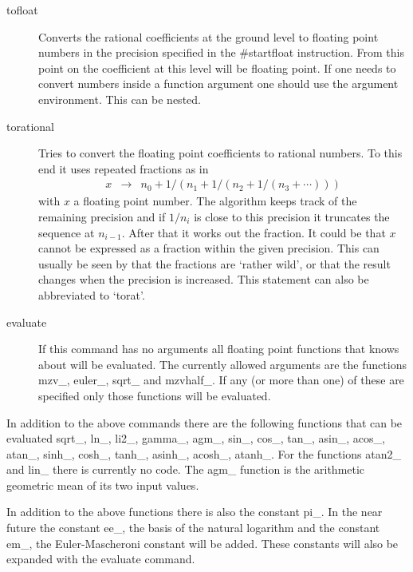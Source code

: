 \begin{description}
\item[tofloat] Converts the rational coefficients at the ground level to 
floating point numbers in the precision specified in the \#startfloat 
instruction. From this point on the coefficient at this level will be 
floating point. If one needs to convert numbers inside a function argument 
one should use the argument environment. This can be nested.
\item[torational] Tries to convert the floating point coefficients to 
rational numbers. To this end it uses repeated fractions as in
\begin{eqnarray}
	x & \rightarrow & n_0 + 1/(n_1+1/(n_2+1/(n_3+\cdots))) \nonumber
\end{eqnarray}
with $x$ a floating point number. The algorithm keeps track of the 
remaining precision and if $1/n_i$ is close to this precision it truncates 
the sequence at $n_{i-1}$. After that it works out the fraction. It could 
be that $x$ cannot be expressed as a fraction within the given precision. 
This can usually be seen by that the fractions are `rather wild', or that 
the result changes when the precision is increased. This statement can also 
be abbreviated to `torat'.
\item[evaluate] If this command has no arguments all floating point 
functions that \FORM knows about will be evaluated. The currently allowed 
arguments are the functions mzv\_, euler\_, sqrt\_ and mzvhalf\_. If any 
(or more than one) of these are specified only those functions will be 
evaluated.
\end{description}
In addition to the above commands there are the following functions that 
can be evaluated sqrt\_, ln\_, li2\_, gamma\_, agm\_, sin\_, cos\_, tan\_,
asin\_, acos\_, atan\_, sinh\_, cosh\_, tanh\_, asinh\_, acosh\_, atanh\_.
For the functions atan2\_ and lin\_ there is currently no code.
The agm\_ function is the arithmetic geometric mean of its two input 
values.

In addition to the above functions there is also the constant pi\_. In the 
near future the constant ee\_, the basis of the natural logarithm and the 
constant em\_, the Euler-Mascheroni constant will be added. These constants 
will also be expanded with the evaluate command.

